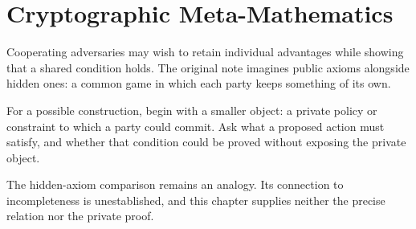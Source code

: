 \chapter{Cryptographic Meta-Mathematics}
\label{short:cryptographic-meta-mathematics}

Cooperating adversaries may wish to retain individual advantages while
showing that a shared condition holds. The original note imagines public
axioms alongside hidden ones: a common game in which each party keeps
something of its own.

For a possible construction, begin with a smaller object: a private policy
or constraint to which a party could commit. Ask what a proposed action must
satisfy, and whether that condition could be proved without exposing the
private object.

The hidden-axiom comparison remains an analogy. Its connection to
incompleteness is unestablished, and this chapter supplies neither the precise
relation nor the private proof.

